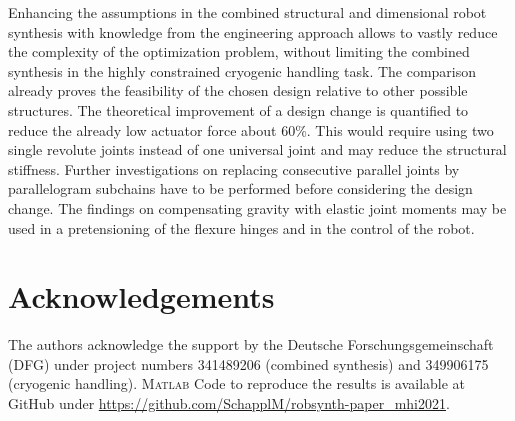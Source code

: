 \documentclass{svproc}
\begin{document}
Enhancing the assumptions in the combined structural and dimensional robot synthesis with knowledge from the engineering approach allows to vastly reduce the complexity of the optimization problem, without limiting the combined synthesis in the highly constrained cryogenic handling task.
The comparison already proves the feasibility of the chosen design relative to other possible structures.
The theoretical improvement of a design change is quantified to reduce the already low actuator force about 60\%.
This would require using two single revolute joints instead of one universal joint and may reduce the structural stiffness.
Further investigations on replacing consecutive parallel joints by parallelogram subchains have to be performed before considering the design change.
The findings on compensating gravity with elastic joint moments may be used in a pretensioning of the flexure hinges and in the control of the robot.


\section*{Acknowledgements}
\vspace{-0.2em}
The authors acknowledge the support by the Deutsche Forschungsgemeinschaft (DFG) under project numbers 341489206 (combined synthesis) and 349906175 (cryogenic handling).
%
\textsc{Matlab} Code to reproduce the results is available at GitHub under
\url{https://github.com/SchapplM/robsynth-paper_mhi2021}.
\vspace{-0.2em}

%
%


\end{document}
